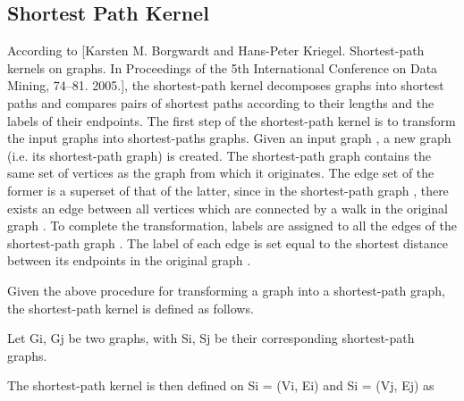 \begin{table}[]
\centering
{}
\caption{}
\label{tab:Road network similarity metrics used in this study, organized by (1) network level and (2) comparison type.}
\end{table}

\subsection{Shortest Path Kernel}

According to [Karsten M. Borgwardt and Hans-Peter Kriegel. Shortest-path kernels on graphs. In Proceedings of the 5th International Conference on Data Mining, 74–81. 2005.], the shortest-path kernel decomposes graphs into shortest paths and compares pairs of shortest paths according to their lengths and the labels of their endpoints. The first step of the shortest-path kernel is to transform the input graphs into shortest-paths graphs. Given an input graph , a new graph  (i.e. its shortest-path graph) is created. The shortest-path graph  contains the same set of vertices as the graph from which it originates. The edge set of the former is a superset of that of the latter, since in the shortest-path graph , there exists an edge between all vertices which are connected by a walk in the original graph . To complete the transformation, labels are assigned to all the edges of the shortest-path graph . The label of each edge is set equal to the shortest distance between its endpoints in the original graph .

Given the above procedure for transforming a graph into a shortest-path graph, the shortest-path kernel is defined as follows.

Let Gi, Gj be two graphs, with Si, Sj be their corresponding shortest-path graphs.

The shortest-path kernel is then defined on Si  = (Vi, Ei) and Si = (Vj, Ej) as

